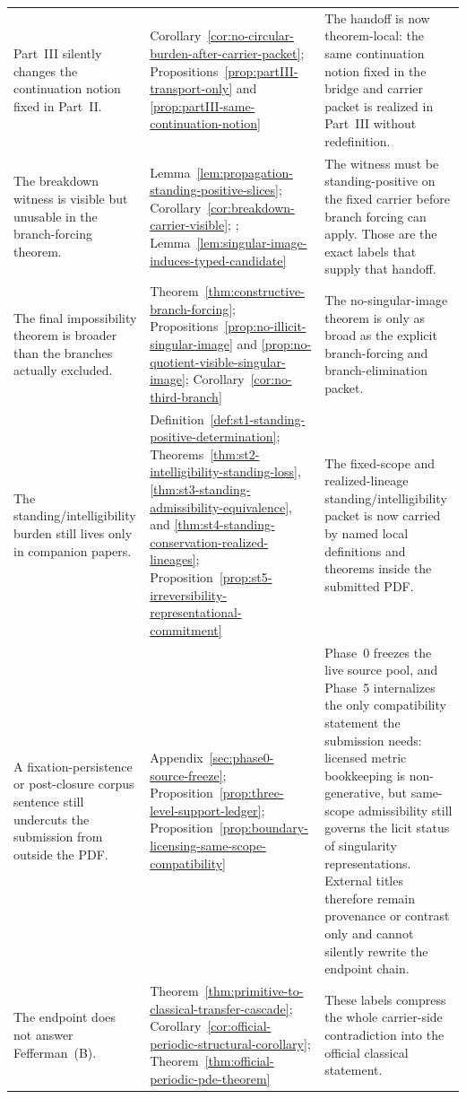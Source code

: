 \begin{tcolorbox}[title={Denial map: what must be denied to keep each objection alive (continued)}, colback=blue!2!white, colframe=blue!55!black, boxsep=1pt, left=2pt, right=2pt, top=2pt, bottom=2pt]
\begin{tabularx}{\textwidth}{@{}L{0.33\textwidth}L{0.31\textwidth}Y@{}}
Part~III silently changes the continuation notion fixed in Part~II. & Corollary~\ref{cor:no-circular-burden-after-carrier-packet}; Propositions~\ref{prop:partIII-transport-only} and \ref{prop:partIII-same-continuation-notion} & The handoff is now theorem-local: the same continuation notion fixed in the bridge and carrier packet is realized in Part~III without redefinition.\\
The breakdown witness is visible but unusable in the branch-forcing theorem. & Lemma~\ref{lem:propagation-standing-positive-slices}; Corollary~\ref{cor:breakdown-carrier-visible}; \HorizonDetectabilityRef{}; Lemma~\ref{lem:singular-image-induces-typed-candidate} & The witness must be standing-positive on the fixed carrier before branch forcing can apply. Those are the exact labels that supply that handoff.\\
The final impossibility theorem is broader than the branches actually excluded. & Theorem~\ref{thm:constructive-branch-forcing}; Propositions~\ref{prop:no-illicit-singular-image} and \ref{prop:no-quotient-visible-singular-image}; Corollary~\ref{cor:no-third-branch} & The no-singular-image theorem is only as broad as the explicit branch-forcing and branch-elimination packet.\\
The standing/intelligibility burden still lives only in companion papers. & Definition~\ref{def:st1-standing-positive-determination}; Theorems~\ref{thm:st2-intelligibility-standing-loss}, \ref{thm:st3-standing-admissibility-equivalence}, and \ref{thm:st4-standing-conservation-realized-lineages}; Proposition~\ref{prop:st5-irreversibility-representational-commitment} & The fixed-scope and realized-lineage standing/intelligibility packet is now carried by named local definitions and theorems inside the submitted PDF.\\
A fixation-persistence or post-closure corpus sentence still undercuts the submission from outside the PDF. & Appendix~\ref{sec:phase0-source-freeze}; Proposition~\ref{prop:three-level-support-ledger}; Proposition~\ref{prop:boundary-licensing-same-scope-compatibility} & Phase~0 freezes the live source pool, and Phase~5 internalizes the only compatibility statement the submission needs: licensed metric bookkeeping is non-generative, but same-scope admissibility still governs the licit status of singularity representations. External titles therefore remain provenance or contrast only and cannot silently rewrite the endpoint chain.\\
The endpoint does not answer Fefferman~(B). & Theorem~\ref{thm:primitive-to-classical-transfer-cascade}; Corollary~\ref{cor:official-periodic-structural-corollary}; Theorem~\ref{thm:official-periodic-pde-theorem} & These labels compress the whole carrier-side contradiction into the official classical statement.\\
\bottomrule
\end{tabularx}
\end{tcolorbox}

\tableofcontents

\newpage